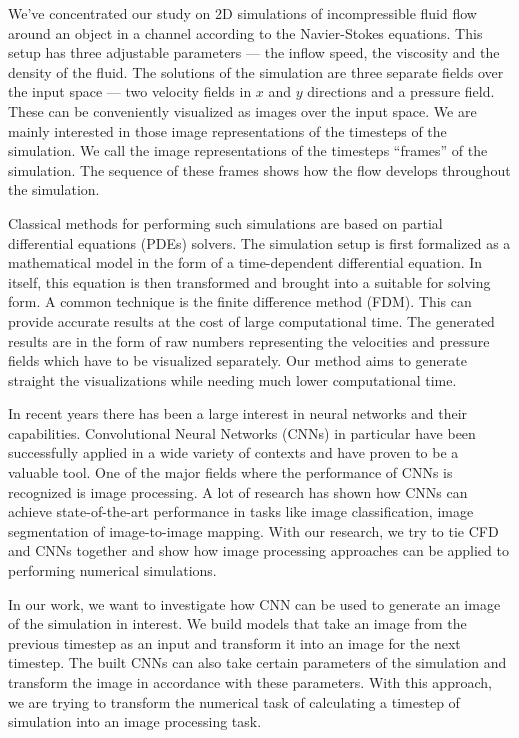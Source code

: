 \documentclass{llncs}
\begin{document}
We've concentrated our study on 2D simulations of incompressible fluid flow around an object in a channel according to the Navier-Stokes equations. This setup has three adjustable parameters --- the inflow speed, the viscosity and the density of the fluid. The solutions of the simulation are three separate fields over the input space --- two velocity fields in $x$ and $y$ directions and a pressure field. These can be conveniently visualized as images over the input space. We are mainly interested in those image representations of the timesteps of the simulation. We call the image representations of the timesteps ``frames'' of the simulation. The sequence of these frames shows how the flow develops throughout the simulation.

Classical methods for performing such simulations are based on partial differential equations (PDEs) solvers. The simulation setup is first formalized as a mathematical model in the form of a time-dependent differential equation. In itself, this equation is then transformed and brought into a suitable for solving form. A common technique is the finite difference method (FDM). This can provide accurate results at the cost of large computational time. The generated results are in the form of raw numbers representing the velocities and pressure fields which have to be visualized separately. Our method aims to generate straight the visualizations while needing much lower computational time.

In recent years there has been a large interest in neural networks and their capabilities. Convolutional Neural Networks (CNNs) in particular have been successfully applied in a wide variety of contexts and have proven to be a valuable tool. One of the major fields where the performance of CNNs is recognized is image processing. A lot of research has shown how CNNs can achieve state-of-the-art performance in tasks like image classification, image segmentation of image-to-image mapping. With our research, we try to tie CFD and CNNs together and show how image processing approaches can be applied to performing numerical simulations.

In our work, we want to investigate how CNN can be used to generate an image of the simulation in interest. We build models that take an image from the previous timestep as an input and transform it into an image for the next timestep. The built CNNs can also take certain parameters of the simulation and transform the image in accordance with these parameters. With this approach, we are trying to transform the numerical task of calculating a timestep of simulation into an image processing task.
\end{document}
